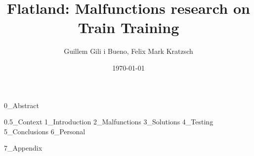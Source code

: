 \documentclass{llncs}
\begin{document}
\title{Flatland: Malfunctions research on Train Training}
\author{Guillem Gili i Bueno, Felix Mark Kratzsch}
\date{\today}
\maketitle

{0_Abstract}

\setcounter{tocdepth}{4}
\tableofcontents
{0.5_Context}
{1_Introduction}
{2_Malfunctions}
{3_Solutions}
{4_Testing}
{5_Conclusions}
{6_Personal}


% 
{}

{7_Appendix}
\end{document}
